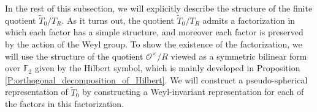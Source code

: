 \documentclass[10pt, letterpaper]{amsart}
\theoremstyle{plain}
\newtheorem{Lem}[equation]{Lemma}
\theoremstyle{definition}
\numberwithin{equation}{section}
\newcommand{\F}{\mathbb{F}}
\newcommand{\Tt}{\widetilde{T}}
\newcommand{\s}{\mathbf{s}}
\newcommand{\Ocal}{\mathcal{O}}
\newcommand{\ie}{{\it i.e.}\ }
\begin{document}

In the rest of this subsection, we will explicitly describe the structure of the finite quotient $\Tt_0\slash T_R$. As it turns out, the quotient $\Tt_0\slash T_R$ admits a factorization in which each factor has a simple structure, and moreover each factor is preserved by the action of the Weyl group. To show the existence of the factorization, we will use the structure of the quotient $\Ocal^\times\slash R$ viewed as a symmetric bilinear form over $\F_2$ given by the Hilbert symbol, which is mainly developed in Proposition \ref{P:orthogonal_decomposition_of_Hilbert}. We will construct a pseudo-spherical representation of $\Tt_{0}$ by constructing a Weyl-invariant representation for each of the factors in this factorization.

\end{document}
